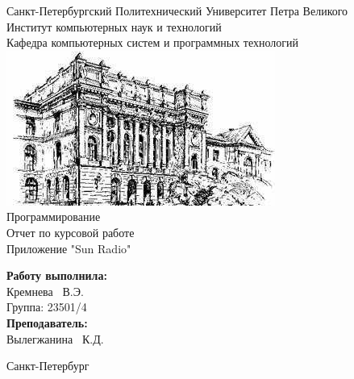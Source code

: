 \documentclass[a4paper]{article}
\begin{document}

\begin{titlepage}	%

	\begin{center}		%

		\large Санкт-Петербургский Политехнический Университет Петра Великого\\
		\large Институт компьютерных наук и технологий \\
		\large Кафедра компьютерных систем и программных технологий\\[2cm]
		
		\includegraphics[scale=0.7]{pics/spbpu.jpg}\\[2cm]
		
		\huge Программирование\\[0.5cm] %
		\large Отчет по курсовой работе \\[0.1cm]
		\large Приложение "Sun Radio"\\[5cm]

	\end{center}


	\begin{flushright} %
		\begin{minipage}{0.25\textwidth} %
			\begin{flushleft} %

				\large\textbf{Работу выполнила:}\\
				\large Кремнева ~В.Э.\\
				\large {Группа:} 23501/4\\
				
				\large \textbf{Преподаватель:}\\
				\large Вылегжанина ~К.Д.

			\end{flushleft}
		\end{minipage}
	\end{flushright}
	
	\vfill %

	\begin{center}
	\large Санкт-Петербург\\
	\large \the\year %
	\end{center} %

\thispagestyle{empty} %
\end{titlepage} %
\end{document}
